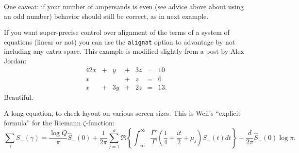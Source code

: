 \documentclass{sn-jnl}
\theoremstyle{thmstyleone}%
\theoremstyle{thmstyletwo}%
\theoremstyle{thmstylethree}%
\newcommand{\mono}[1]{\texttt{#1}}
\numberwithin{equation}{section}
\newcommand{\amp}{&}
\begin{document}
One caveat: if your number of ampersands is even (see advice above about using an odd number) behavior should still be correct, as in next example.%
\par
If you want super-precise control over alignment of the terms of a system of equations (linear or not) you can use the \mono{alignat} option to advantage by not including any extra space.  This example is modified slightly from a post by Alex Jordan:%
\begin{alignat*}{4}
2x \amp {}+{} \amp  y \amp {}+{} \amp 3z \amp {}={} \amp 10\\
x  \amp       \amp    \amp {}+{} \amp  z \amp {}={} \amp 6\\
x  \amp {}+{} \amp 3y \amp {}+{} \amp 2z \amp {}={} \amp 13.
\end{alignat*}
Beautiful.%
\par
A long equation, to check layout on various screen sizes.  This is Weil's ``explicit formula'' for the Riemann \(\zeta\)-function:%
\begin{equation}
\sum_\gamma S_-(\gamma) = \frac{\log Q}{\pi} \hat S_-(0)
+ \frac{1}{2\pi} \sum_{j=1}^d \Re\left\{ \int_{-\infty}^\infty \frac{\Gamma'}{\Gamma}\left(\frac{1}{4} + \frac{it}{2} + \mu_j\right)S_-(t) dt\right\}
- \frac{d}{2\pi}\hat S_-(0)\log \pi\text{.}\label{section-mathematics-4-8-3}
\end{equation}
%
\end{document}
